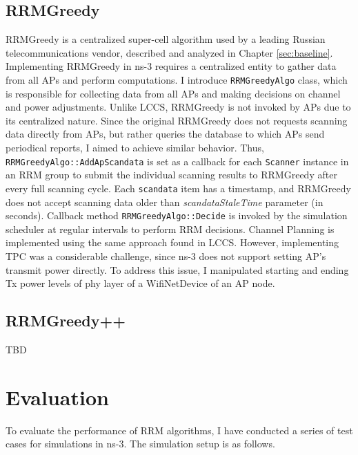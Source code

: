 \subsection{RRMGreedy}
\label{chap:impl:sec:implementation:rrmgreedy}
RRMGreedy is a centralized super-cell algorithm used by a leading Russian telecommunications vendor, described and analyzed in Chapter \ref{sec:baseline}.
Implementing RRMGreedy in ns-3 requires a centralized entity to gather data from all APs and perform computations. I introduce \texttt{RRMGreedyAlgo} class, which is responsible for collecting data from all APs and making decisions on channel and power adjustments.
Unlike LCCS, RRMGreedy is not invoked by APs due to its centralized nature. Since the original RRMGreedy does not requests scanning data directly from APs, but rather queries the database to which APs send periodical reports, I aimed to achieve similar behavior.
Thus, \texttt{RRMGreedyAlgo::AddApScandata} is set as a callback for each \texttt{Scanner} instance in an RRM group to submit the individual scanning results to RRMGreedy after every full scanning cycle. Each \texttt{scandata} item has a timestamp, and RRMGreedy does not accept scanning data older than \textit{scandataStaleTime} parameter (in seconds). Callback method \texttt{RRMGreedyAlgo::Decide} is invoked by the simulation scheduler at regular intervals to perform RRM decisions.
Channel Planning is implemented using the same approach found in LCCS. However, implementing TPC was a considerable challenge, since ns-3 does not support setting AP's transmit power directly. To address this issue, I manipulated starting and ending Tx power levels of phy layer of a WifiNetDevice of an AP node.

\subsection{RRMGreedy++}
\label{chap:impl:sec:implementation:rrmv2}
TBD

\section{Evaluation}
\label{chap:impl:sec:eval}
To evaluate the performance of RRM algorithms, I have conducted a series of test cases for simulations in ns-3.
The simulation setup is as follows.

